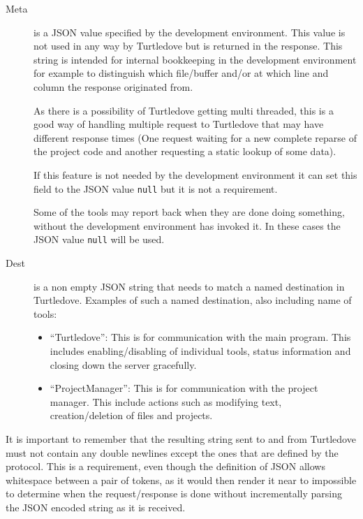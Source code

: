 \begin{description}
\item[Meta] is a JSON value specified by the development environment. This value
  is not used in any way by Turtledove but is returned in the response. This
  string is intended for internal bookkeeping in the development environment for
  example to distinguish which file/buffer and/or at which line and column the
  response originated from.

  As there is a possibility of Turtledove getting multi threaded, this is a good
  way of handling multiple request to Turtledove that may have different
  response times (One request waiting for a new complete reparse of the project
  code and another requesting a static lookup of some data).

  If this feature is not needed by the development environment it can set this
  field to the JSON value \texttt{null} but it is not a requirement.

  Some of the tools may report back when they are done doing something, without
  the development environment has invoked it. In these cases the JSON value
  \texttt{null} will be used.

\item[Dest] is a non empty JSON string that needs to match a named destination in
  Turtledove. Examples of such a named destination, also including name of
  tools:

  \begin{itemize}
  \item ``Turtledove'': This is for communication with the main program. This
    includes enabling/disabling of individual tools, status information and
    closing down the server gracefully.

  \item ``ProjectManager'': This is for communication with the project
    manager. This include actions such as modifying text, creation/deletion of
    files and projects.
  \end{itemize}
\end{description}


It is important to remember that the resulting string sent to and from
Turtledove must not contain any double newlines except the ones that are defined by
the protocol. This is a requirement, even though the definition of JSON allows
whitespace between a pair of tokens, as it would then render it near to
impossible to determine when the request/response is done without incrementally
parsing the JSON encoded string as it is received.

